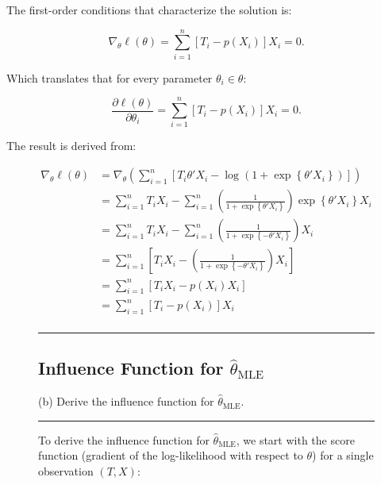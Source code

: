 \documentclass{article}
\newenvironment{colorparagraph}[1]{\par\color{#1}}{\par}
\begin{document}
The first-order conditions that characterize the solution is:

\[
\nabla_{\theta} \ell(\theta) = \sum_{i=1}^n \left[ T_i - p(X_i) \right] X_i = 0.
\]

Which translates that for every parameter $\theta_i \in \theta$: 

\[
\frac{\partial \ell(\theta)}{\partial \theta_i} = \sum_{i=1}^n \left[ T_i - p(X_i) \right] X_i = 0.
\]

The result is derived from:

\begin{align*}
  \nabla_{\theta} \ell(\theta)
  &= \nabla_{\theta} \left(\sum_{i=1}^n
    \left[
      T_i \theta' X_i - \log \left( 1 + \exp\left\{ \theta' X_i \right\} \right)
    \right]
    \right)
    \\
   &= 
   \sum_{i=1}^n
      T_i X_i
      -
    \sum_{i=1}^n
    \left(
      \frac{1}{1 + \exp\left\{ \theta' X_i \right\}}
    \right)
    \exp\left\{ \theta' X_i \right\} X_i
    \\
  &= 
    \sum_{i=1}^n
       T_i X_i
       -
     \sum_{i=1}^n
     \left(
       \frac{1}{1 + \exp\left\{ - \theta' X_i \right\}}
     \right)
     X_i
     \\
  &= 
     \sum_{i=1}^n
     \left[
        T_i X_i
        -
      \left(
        \frac{1}{1 + \exp\left\{ - \theta' X_i \right\}}
      \right)
      X_i
    \right] \\
  &= 
    \sum_{i=1}^n
    \left[
       T_i X_i
       -
     p(X_i)
     X_i
   \right] \\
  &= 
   \sum_{i=1}^n
   \left[
      T_i
      -
    p(X_i)
  \right]
  X_i \\
\end{align*}

\begin{figure}[H]
\begin{colorparagraph}{questioncolor}
\label{q1b}
\rule{\textwidth}{0.5pt}
\subsection{Influence Function for \( \hat{\theta}_{\text{MLE}} \)}
(b) Derive the influence function for \( \hat{\theta}_{\text{MLE}} \).

\rule{\textwidth}{0.5pt}
\end{colorparagraph}

To derive the influence function for \( \hat{\theta}_{\text{MLE}} \), we start with the score function (gradient of the log-likelihood with respect to $\theta$) for a single observation \( (T, X) \):
\end{figure}
\end{document}
